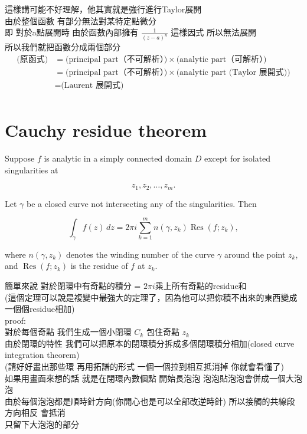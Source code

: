 \documentclass{article}
\begin{document}
這樣講可能不好理解，他其實就是強行進行Taylor展開\\
由於整個函數 有部分無法對某特定點微分\\
即 對於a點展開時 由於函數內部擁有 $\frac{1}{(z-a)^n}$ 這樣因式 所以無法展開\\ 
所以我們就把函數分成兩個部分\\
\begin{align*}
    \text{(原函式)} 
    &= \text{(principal part（不可解析）)} \times \text{(analytic part（可解析）)} \\
    &= \text{(principal part（不可解析）)} \times \text{(analytic part (Taylor 展開式))} \\
    &= \text{(Laurent 展開式)}\\
\end{align*}

\section{Cauchy residue theorem}
Suppose \( f \) is analytic in a simply connected domain \( D \) except for isolated singularities at 


\[
z_1, z_2, \dots, z_m.
\]


Let \( \gamma \) be a closed curve not intersecting any of the singularities. Then


\[
\int_{\gamma} f(z)\,dz = 2\pi i \sum_{k=1}^{m} n(\gamma, z_k) \operatorname{Res}(f; z_k),
\]


where \( n(\gamma, z_k) \) denotes the winding number of the curve \( \gamma \) around the point \( z_k \), and \( \operatorname{Res}(f; z_k) \) is the residue of \( f \) at \( z_k \).

簡單來說 對於閉環中有奇點的積分 = $2\pi i$乘上所有奇點的residue和\\
(這個定理可以說是複變中最強大的定理了，因為他可以把你積不出來的東西變成一個個residue相加)\\

proof:\\
對於每個奇點 我們生成一個小閉環 $C_k$ 包住奇點 $z_k$\\
由於閉環的特性 我們可以把原本的閉環積分拆成多個閉環積分相加(closed curve integration theorem)\\
(請好好畫出那些環 再用拓譜的形式 一個一個拉到相互抵消掉 你就會看懂了)\\
如果用畫面來想的話 就是在閉環內數個點 開始長泡泡 泡泡貼泡泡會併成一個大泡泡\\
由於每個泡泡都是順時針方向(你開心也是可以全部改逆時針) 所以接觸的共線段方向相反 會抵消\\
只留下大泡泡的部分\\
\end{document}
